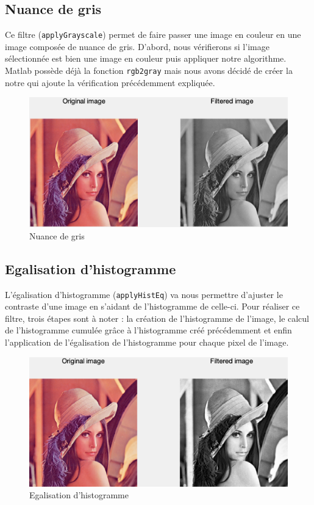 \documentclass[12pt,a4paper]{article}
\begin{document}
\subsection{Nuance de gris}
Ce filtre (\texttt{applyGrayscale}) permet de faire passer une image en couleur en une image composée de nuance de gris. D'abord, nous vérifierons si l'image sélectionnée est bien une image en couleur puis appliquer notre algorithme. Matlab possède déjà la fonction \texttt{rgb2gray} mais nous avons décidé de créer la notre qui ajoute la vérification précédemment expliquée.

\begin{figure}[H]
\centering
\includegraphics[scale=0.5]{img/grayscale}
\caption{Nuance de gris}
\end{figure}
    
\subsection{Egalisation d'histogramme}
L'égalisation d'histogramme (\texttt{applyHistEq}) va nous permettre d'ajuster le contraste d'une image en s'aidant de l'histogramme de celle-ci. Pour réaliser ce filtre, trois étapes sont à noter : la création de l'histogramme de l'image, le calcul de l'histogramme cumulée grâce à l'histogramme créé précédemment et enfin l'application de l'égalisation de l'histogramme pour chaque pixel de l'image.

\begin{figure}[H]
\centering
\includegraphics[scale=0.5]{img/heq}
\caption{Egalisation d'histogramme}
\end{figure}
\end{document}
